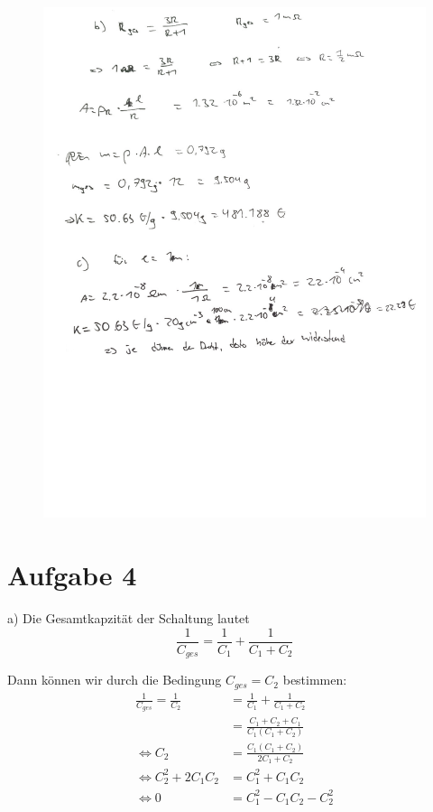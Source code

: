 \documentclass[11pt a4paper]{article}
\begin{document}
\newpage
\begin{figure}[H]
	\centering
	\includegraphics[width=15cm]{roman/3_3_cleaned.jpg}
\end{figure}
\newpage

\section*{Aufgabe 4}
a)
Die Gesamtkapzität der Schaltung lautet
\[
	\frac{1}{C_{ges}} = \frac{1}{C_1} + \frac{1}{C_1 + C_2}
\]

Dann können wir durch die Bedingung $C_{ges} = C_2$ bestimmen:
\begin{align*}
	\frac{1}{C_{ges}} = \frac{1}{C_2}
	&= \frac{1}{C_1} + \frac{1}{C_1 + C_2} \\
	&= \frac{C_1 + C_2 + C_1}{C_1 (C_1 + C_2)} \\
	\Leftrightarrow
	C_2 &= \frac{C_1 (C_1 + C_2)}{2C_1 + C_2} \\
	\Leftrightarrow
	C_2^2 + 2C_1C_2 &= C_1^2 + C_1C_2 \\
	\Leftrightarrow
	0 &= C_1^2 - C_1C_2 - C_2^2
\end{align*}
\end{document}
